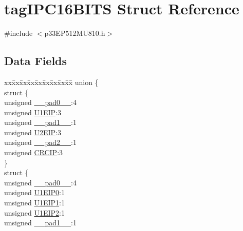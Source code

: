 \hypertarget{structtag_i_p_c16_b_i_t_s}{}\section{tag\+I\+P\+C16\+B\+I\+TS Struct Reference}
\label{structtag_i_p_c16_b_i_t_s}


{\ttfamily \#include $<$p33\+E\+P512\+M\+U810.\+h$>$}

\subsection*{Data Fields}
\begin{DoxyCompactItemize}
\item 
\begin{tabbing}
xx\=xx\=xx\=xx\=xx\=xx\=xx\=xx\=xx\=\kill
union \{\\
\>struct \{\\
\>\>unsigned \hyperlink{structtag_i_p_c16_b_i_t_s_adf71f3d8410c1f1dbbc96680a92c49af}{\_\_pad0\_\_}:4\\
\>\>unsigned \hyperlink{structtag_i_p_c16_b_i_t_s_a6bb48fb10fca7dc76d2c0608fe0a2b18}{U1EIP}:3\\
\>\>unsigned \hyperlink{structtag_i_p_c16_b_i_t_s_acaf2d0924a107ec6e8d2e31febaf66f9}{\_\_pad1\_\_}:1\\
\>\>unsigned \hyperlink{structtag_i_p_c16_b_i_t_s_ae683c717d69d20eb792e7826127a14aa}{U2EIP}:3\\
\>\>unsigned \hyperlink{structtag_i_p_c16_b_i_t_s_a4d97cc5f7d51d22fc2bf3eab35c9cb7f}{\_\_pad2\_\_}:1\\
\>\>unsigned \hyperlink{structtag_i_p_c16_b_i_t_s_ab90a7611d25e6b4b5d517d85613620d3}{CRCIP}:3\\
\>\} \\
\>struct \{\\
\>\>unsigned \hyperlink{structtag_i_p_c16_b_i_t_s_adf71f3d8410c1f1dbbc96680a92c49af}{\_\_pad0\_\_}:4\\
\>\>unsigned \hyperlink{structtag_i_p_c16_b_i_t_s_aa9d6aab83db59e4e1c9341d212384e2e}{U1EIP0}:1\\
\>\>unsigned \hyperlink{structtag_i_p_c16_b_i_t_s_ace3ec6903fa7c3791a820b6e383a8b0b}{U1EIP1}:1\\
\>\>unsigned \hyperlink{structtag_i_p_c16_b_i_t_s_afff32845faf835f66d2fd5b5468a3319}{U1EIP2}:1\\
\>\>unsigned \hyperlink{structtag_i_p_c16_b_i_t_s_acaf2d0924a107ec6e8d2e31febaf66f9}{\_\_pad1\_\_}:1\\

\end{tabbing}
\end{DoxyCompactItemize}
